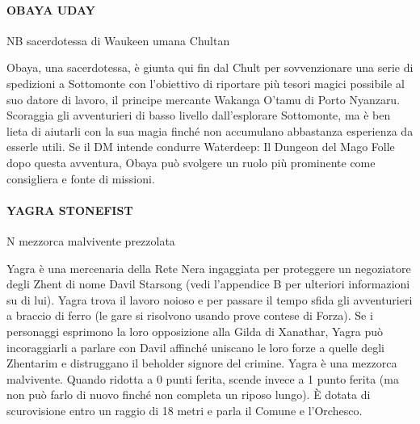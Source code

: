 \documentclass{article}
\begin{document}
\paragraph{OBAYA UDAY}
NB sacerdotessa di Waukeen umana Chultan

Obaya, una sacerdotessa, è giunta qui fin dal Chult per sovvenzionare una serie di spedizioni a Sottomonte con l’obiettivo di riportare più tesori magici possibile al suo datore di lavoro, il principe mercante Wakanga O’tamu di Porto Nyanzaru. Scoraggia gli avventurieri di basso livello dall’esplorare Sottomonte, ma è ben lieta di aiutarli con la sua magia finché non accumulano abbastanza esperienza da esserle utili. Se il DM intende condurre Waterdeep: Il Dungeon del Mago Folle dopo questa avventura, Obaya può svolgere un ruolo più prominente come consigliera e fonte di missioni.

\paragraph{YAGRA STONEFIST}
N mezzorca malvivente prezzolata

Yagra è una mercenaria della Rete Nera ingaggiata per proteggere un negoziatore degli Zhent di nome Davil Starsong (vedi l'appendice B per ulteriori informazioni su di lui). Yagra trova il lavoro noioso e per passare il tempo sfida gli avventurieri a braccio di ferro (le gare si risolvono usando prove contese di Forza). Se i personaggi esprimono la loro opposizione alla Gilda di Xanathar, Yagra può incoraggiarli a parlare con Davil affinché uniscano le loro forze a quelle degli Zhentarim e distruggano il beholder signore del crimine. Yagra è una mezzorca malvivente. Quando ridotta a 0 punti ferita, scende invece a 1 punto ferita (ma non può farlo di nuovo finché non completa un riposo lungo). È dotata di scurovisione entro un raggio di 18 metri e parla il Comune e l'Orchesco.
\end{document}
